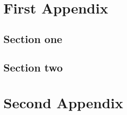 \documentclass[article, doublespace,nopageskip]{VTthesis} %
\begin{document}
    

	\appendix

	\begin{appendices}
		\chapter{First Appendix} \label{app:appendix_one}
			\section{Section one} \label{ase:app_one_sect_1}
			\section{Section two} \label{ase:app_one_sect_2}
		\chapter{Second Appendix} \label{app:appendix_two}
	\end{appendices}
 
    
    
\end{document}
